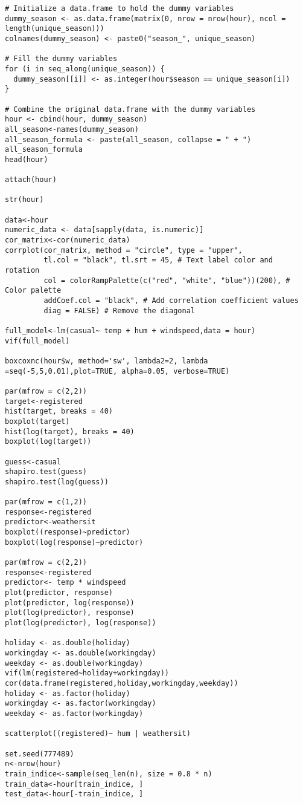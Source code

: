 \begin{lstlisting}
# Initialize a data.frame to hold the dummy variables
dummy_season <- as.data.frame(matrix(0, nrow = nrow(hour), ncol = length(unique_season)))
colnames(dummy_season) <- paste0("season_", unique_season)

# Fill the dummy variables
for (i in seq_along(unique_season)) {
  dummy_season[[i]] <- as.integer(hour$season == unique_season[i])
}

# Combine the original data.frame with the dummy variables
hour <- cbind(hour, dummy_season)
all_season<-names(dummy_season)
all_season_formula <- paste(all_season, collapse = " + ")
all_season_formula
head(hour)

attach(hour)

str(hour)

data<-hour
numeric_data <- data[sapply(data, is.numeric)]
cor_matrix<-cor(numeric_data)
corrplot(cor_matrix, method = "circle", type = "upper",
         tl.col = "black", tl.srt = 45, # Text label color and rotation
         col = colorRampPalette(c("red", "white", "blue"))(200), # Color palette
         addCoef.col = "black", # Add correlation coefficient values
         diag = FALSE) # Remove the diagonal

full_model<-lm(casual~ temp + hum + windspeed,data = hour)
vif(full_model)

boxcoxnc(hour$w, method='sw', lambda2=2, lambda =seq(-5,5,0.01),plot=TRUE, alpha=0.05, verbose=TRUE)

par(mfrow = c(2,2))
target<-registered
hist(target, breaks = 40)
boxplot(target)
hist(log(target), breaks = 40)
boxplot(log(target))

guess<-casual
shapiro.test(guess)
shapiro.test(log(guess))

par(mfrow = c(1,2))
response<-registered
predictor<-weathersit
boxplot((response)~predictor)
boxplot(log(response)~predictor)

par(mfrow = c(2,2))
response<-registered
predictor<- temp * windspeed
plot(predictor, response)
plot(predictor, log(response))
plot(log(predictor), response)
plot(log(predictor), log(response))

holiday <- as.double(holiday)
workingday <- as.double(workingday)
weekday <- as.double(workingday)
vif(lm(registered~holiday+workingday))
cor(data.frame(registered,holiday,workingday,weekday))
holiday <- as.factor(holiday)
workingday <- as.factor(workingday)
weekday <- as.factor(workingday)

scatterplot((registered)~ hum | weathersit)

set.seed(777489)
n<-nrow(hour)
train_indice<-sample(seq_len(n), size = 0.8 * n)
train_data<-hour[train_indice, ]
test_data<-hour[-train_indice, ]


\end{lstlisting}
